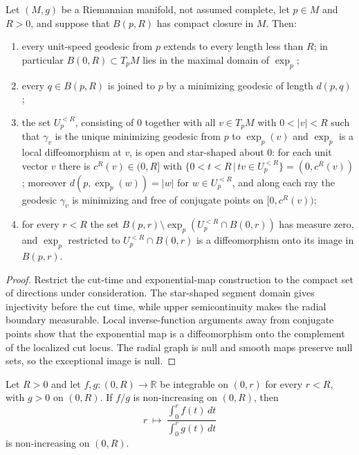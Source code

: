 \begin{lemma}
\label{lem:localized-cut-locus}

Let $(M,g)$ be a Riemannian manifold, not assumed complete, let
$p\in M$ and $R>0$, and suppose that $B(p,R)$ has compact closure
in $M$. Then:
\begin{enumerate}
\item every unit-speed geodesic from $p$ extends to every length
less than $R$; in particular
$B(0,R)\subset T_pM$ lies in the maximal domain of $\exp_p$;
\item every $q\in B(p,R)$ is joined to $p$ by a minimizing geodesic
of length $d(p,q)$;
\item the set $U_p^{<R}$, consisting of $0$ together with all $v\in
T_pM$ with $0<|v|<R$ such that $\gamma_v$ is the unique minimizing
geodesic from $p$ to $\exp_p(v)$ and $\exp_p$ is a local
diffeomorphism at $v$, is open and star-shaped about $0$: for each
unit vector $v$ there is $c^R(v)\in(0,R]$ with $\{0<t<R\,|\,tv\in
U_p^{<R}\}=(0,c^R(v))$; moreover $d(p,\exp_p(w))=|w|$ for $w\in
U_p^{<R}$, and along each ray the geodesic $\gamma_v$ is minimizing
and free of conjugate points on $[0,c^R(v))$;
\item for every $r<R$ the set $B(p,r)\setminus
\exp_p\left(U_p^{<R}\cap B(0,r)\right)$ has measure zero, and
$\exp_p$ restricted to $U_p^{<R}\cap B(0,r)$ is a
diffeomorphism onto its image in $B(p,r)$.
\end{enumerate}
\end{lemma}

\begin{proof}
\sketch
{}
Restrict the cut-time and exponential-map construction to the compact set of directions under consideration. The star-shaped segment domain gives injectivity before the cut time, while upper semicontinuity makes the radial boundary measurable. Local inverse-function arguments away from conjugate points show that the exponential map is a diffeomorphism onto the complement of the localized cut locus. The radial graph is null and smooth maps preserve null sets, so the exceptional image is null.
\end{proof}

\begin{lemma}
\label{lem:integral-ratio-monotone}




Let $R>0$ and let $f,g\colon(0,R)\to\mathbb R$ be integrable on $(0,r)$ for
every $r<R$, with $g>0$ on $(0,R)$. If $f/g$ is non-increasing on $(0,R)$,
then
$$r\ \longmapsto\ \frac{\int_0^rf(t)\,dt}{\int_0^rg(t)\,dt}$$
is non-increasing on $(0,R)$.
\end{lemma}

